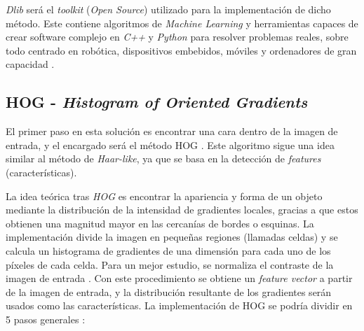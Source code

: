 \textit{Dlib} será el \textit{toolkit} (\textit{Open Source}) utilizado para la implementación de dicho método. Este contiene algoritmos de \textit{Machine Learning} y herramientas capaces de crear software complejo en \textit{C++} y \textit{Python} para resolver problemas reales, sobre todo centrado en robótica, dispositivos embebidos, móviles y ordenadores de gran capacidad \cite{dlib}. 

\vspace{-0.7cm}
\subsection*{HOG - \textit{Histogram of Oriented Gradients}}
\vspace{-0.5cm}
El primer paso en esta solución es encontrar una cara dentro de la imagen de entrada, y el encargado será el método HOG \cite{hog}. Este algoritmo sigue una idea similar al método de \textit{Haar-like}, ya que se basa en la detección de \textit{features} (características).

La idea teórica tras \textit{HOG} es encontrar la apariencia y forma de un objeto mediante la distribución de la intensidad de gradientes locales, gracias a que estos obtienen una magnitud mayor en las cercanías de bordes o esquinas. La implementación divide la imagen en pequeñas regiones (llamadas celdas) y se calcula un histograma de gradientes de una dimensión para cada uno de los píxeles de cada celda. Para un mejor estudio, se normaliza el contraste de la imagen de entrada \cite{hog}. Con este procedimiento se obtiene un \textit{feature vector} a partir de la imagen de entrada, y la distribución resultante de los gradientes serán usados como las características. La implementación de HOG se podría dividir en 5 pasos generales \cite{hog2}:


